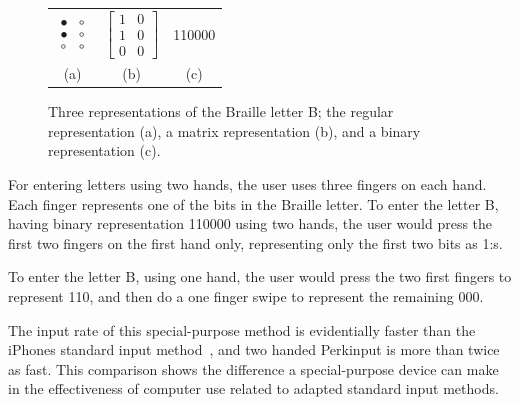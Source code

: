 \begin{figure}[h!]
\centering

\begin{tabular}{c c c}

$
\begin{array}{cc}
\bullet & \circ \\
\bullet & \circ \\
\circ & \circ \end{array}
$

&

$
\left[ \begin{array}{cc}
1 & 0 \\
1 & 0 \\
0 & 0 \end{array} \right]
$ 

&

110000 \\

(a) & (b) & (c)

\end{tabular}


\caption{Three representations of the Braille letter B; the regular representation (a), a matrix representation (b), and a binary representation (c).}
\label{fig:brailleexample}


\end{figure}


For entering letters using two hands, the user uses three fingers on each hand. Each finger represents one of the bits in the Braille letter. To enter the letter B, having binary representation 110000 using two hands, the user would press the first two fingers on the first hand only, representing only the first two bits as 1:s.

To enter the letter B, using one hand, the user would press the two first fingers to represent 110, and then do a one finger swipe to represent the remaining 000.

The input rate of this special-purpose method is evidentially faster than the iPhones standard input method~\cite{azenkot}, and two handed Perkinput is more than twice as fast. This comparison shows the difference a special-purpose device can make in the effectiveness of computer use related to adapted standard input methods. 


